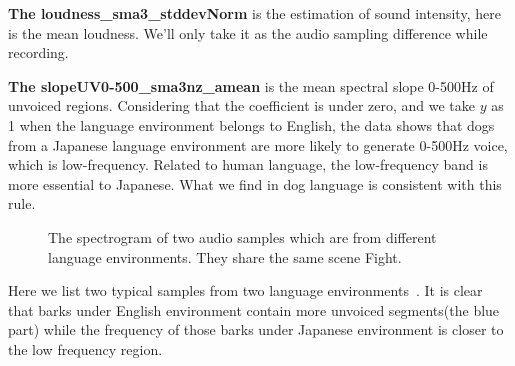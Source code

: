 \textbf{The loudness\_sma3\_stddevNorm} is the estimation of sound intensity, here is the mean loudness. We'll only take it as the audio sampling difference while recording.

\textbf{The slopeUV0-500\_sma3nz\_amean} is the mean spectral slope 0-500Hz of unvoiced regions. Considering that the coefficient is under zero, and we take $y$ as 1 when the language environment belongs to English, the data shows that dogs from a Japanese language environment are more likely to generate 0-500Hz voice, which is low-frequency. Related to human language, the low-frequency band is more essential to Japanese\cite{ueda2010effects,lo18soundfreq}. What we find in dog language is consistent with this rule.


\begin{figure}[H]
	\centering
	\caption{The spectrogram of two audio samples which are from different language environments. They share the same scene Fight.}
	\label{Fig.sample}
\end{figure}

Here we list two typical samples from two language environments~. It is clear that barks under English environment contain more unvoiced segments(the blue part) while the frequency of those barks under Japanese environment is closer to the low frequency region.






















